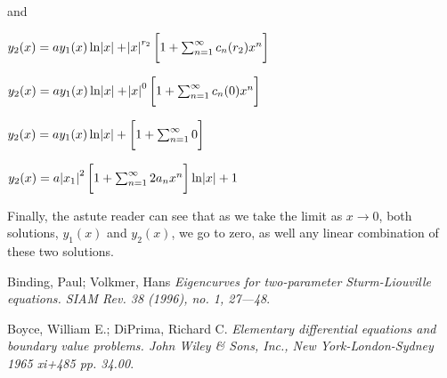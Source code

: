 \documentclass[executivepaper]{article}
\begin{document}
and

\begin{center}

$y_{2}(x)=ay_{1}(x) \ln{\abs{x}} + \abs{x}^{r_{2}} \bigg[1 + \sum_{n=1}^{\infty} c_{n}(r_{2})x^n\bigg]$

\vspace{2mm}

$y_{2}(x)=ay_{1}(x) \ln{\abs{x}} + \abs{x}^{0} \bigg[1 + \sum_{n=1}^{\infty} c_{n}(0)x^n\bigg]$

\vspace{2mm}

$y_{2}(x)=ay_{1}(x) \ln{\abs{x}} + \bigg[1 + \sum_{n=1}^{\infty} 0 \bigg]$

\vspace{2mm}

$y_{2}(x)=a \abs{x_{1}}^{2} \bigg[1 + \sum_{n=1}^{\infty} 2a_{n}x^n\bigg] \ln{\abs{x}} + 1$

\end{center}

Finally, the astute reader can see that as we take the limit as $x \rightarrow 0$, both solutions, $y_{1}(x)$ and $y_{2}(x)$, we go to zero, as well any linear combination of these two solutions.

\pagebreak

\vspace*{-40mm}

\begin{center}

\begin{thebibliography}{9}

Binding, Paul; Volkmer, Hans
\textit{Eigencurves for two-parameter Sturm-Liouville equations. SIAM Rev. 38 (1996), no. 1, 27---48}.

\vspace{1mm}

Boyce, William E.; DiPrima, Richard C.
\textit{Elementary differential equations and boundary value problems. John Wiley \& Sons, Inc., New York-London-Sydney 1965 xi+485 pp. 34.00}. 

\end{thebibliography}

\end{center}
\end{document}
